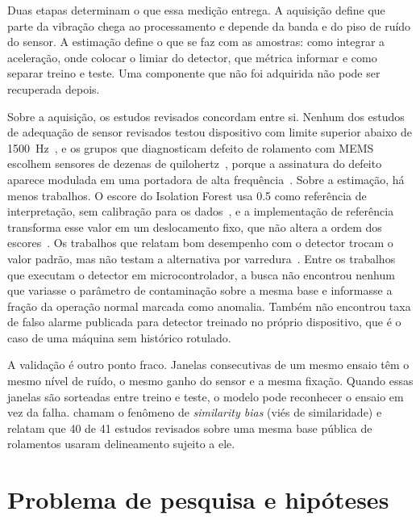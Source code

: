 Duas etapas determinam o que essa medição entrega. A aquisição define que parte da
vibração chega ao processamento e depende da banda e do piso de ruído do sensor. A
estimação define o que se faz com as amostras: como integrar a aceleração, onde colocar o
limiar do detector, que métrica informar e como separar treino e teste. Uma componente que
não foi adquirida não pode ser recuperada depois.

Sobre a aquisição, os estudos revisados concordam entre si. Nenhum dos estudos de adequação de
sensor revisados testou dispositivo com limite superior abaixo de \SI{1500}{\hertz}~\cite{albarbar2008},
e os grupos que diagnosticam defeito de rolamento com MEMS escolhem sensores de dezenas de
quilohertz~\cite{jakobsen2024,landi2023}, porque a assinatura do defeito aparece modulada
em uma portadora de alta frequência~\cite{antoni2007,randall2011}. Sobre a estimação, há
menos trabalhos. O escore do Isolation Forest usa \num{0,5} como referência de
interpretação, sem calibração para os dados~\cite{liu2008}, e a implementação de
referência transforma esse valor em um deslocamento fixo, que não altera a ordem dos
escores~\cite{scikitlearn2026}. Os trabalhos que relatam bom desempenho com o detector
trocam o valor padrão, mas não testam a alternativa por varredura~\cite{antonini2023,brito2022}.
Entre os trabalhos que executam o detector em microcontrolador, a busca não encontrou
nenhum que variasse o parâmetro de contaminação sobre a mesma base e informasse a fração
da operação normal marcada como anomalia. Também não encontrou taxa de falso alarme
publicada para detector treinado no próprio dispositivo, que é o caso de uma máquina sem
histórico rotulado.

A validação é outro ponto fraco. Janelas consecutivas de um mesmo ensaio têm o mesmo nível
de ruído, o mesmo ganho do sensor e a mesma fixação. Quando essas janelas são sorteadas
entre treino e teste, o modelo pode reconhecer o ensaio em vez da falha.
 chamam o fenômeno de \emph{similarity bias} (viés de similaridade)
e relatam que \num{40} de \num{41} estudos revisados sobre uma mesma base pública de
rolamentos usaram delineamento sujeito a ele.


\section{Problema de pesquisa e hipóteses}
\label{sec:intro-problema}

